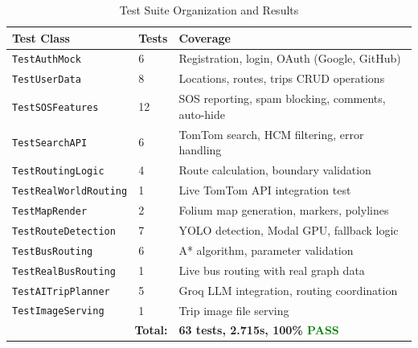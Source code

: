 \begin{table}[H]
    \centering
    \renewcommand{\arraystretch}{1.2}
    \footnotesize
    \begin{tabularx}{\textwidth}{|p{4cm}|p{1.5cm}|X|}
        \hline
        \textbf{Test Class} & \textbf{Tests} & \textbf{Coverage} \\
        \hline
        \texttt{TestAuthMock} & 6 & Registration, login, OAuth (Google, GitHub) \\
        \hline
        \texttt{TestUserData} & 8 & Locations, routes, trips CRUD operations \\
        \hline
        \texttt{TestSOSFeatures} & 12 & SOS reporting, spam blocking, comments, auto-hide \\
        \hline
        \texttt{TestSearchAPI} & 6 & TomTom search, HCM filtering, error handling \\
        \hline
        \texttt{TestRoutingLogic} & 4 & Route calculation, boundary validation \\
        \hline
        \texttt{TestRealWorldRouting} & 1 & Live TomTom API integration test \\
        \hline
        \texttt{TestMapRender} & 2 & Folium map generation, markers, polylines \\
        \hline
        \texttt{TestRouteDetection} & 7 & YOLO detection, Modal GPU, fallback logic \\
        \hline
        \texttt{TestBusRouting} & 6 & A* algorithm, parameter validation \\
        \hline
        \texttt{TestRealBusRouting} & 1 & Live bus routing with real graph data \\
        \hline
        \texttt{TestAITripPlanner} & 5 & Groq LLM integration, routing coordination \\
        \hline
        \texttt{TestImageServing} & 1 & Trip image file serving \\
        \hline
        \multicolumn{2}{|r|}{\textbf{Total:}} & \textbf{63 tests, 2.715s, 100\% \textcolor{green}{PASS}}\\
        \hline
    \end{tabularx}
    \caption{Test Suite Organization and Results}
\end{table}


